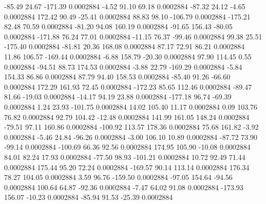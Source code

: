       -85.49       24.67     -171.39     0.0002884
       -4.52       91.10       69.18     0.0002884
      -87.32       24.12       -4.65     0.0002884
      172.42       90.49      -25.41     0.0002884
       88.83       98.10     -106.79     0.0002884
     -175.21       82.48       70.59     0.0002884
      -81.20       94.08      160.19     0.0002884
      -91.65      156.43      -80.05     0.0002884
     -171.88       76.24       77.01     0.0002884
      -11.15       76.37      -99.46     0.0002884
       99.38       25.51     -175.40     0.0002884
      -81.81       20.36      168.08     0.0002884
       87.17       72.91       86.21     0.0002884
       11.86      106.57     -169.44     0.0002884
       -6.88      158.79      -20.30     0.0002884
       97.90      114.45        0.55     0.0002884
      -94.51       88.73      174.53     0.0002884
       -3.88       22.79     -169.29     0.0002884
       -5.84      154.33       86.86     0.0002884
       87.79       94.40      158.53     0.0002884
      -85.40       91.26      -66.60     0.0002884
      172.29      161.93       72.45     0.0002884
     -172.23       85.65      112.46     0.0002884
      -89.47       81.66      -19.03     0.0002884
      -14.17       94.19       23.88     0.0002884
     -177.18       96.74      -69.39     0.0002884
        1.24       23.93     -101.75     0.0002884
       14.02      105.40       11.17     0.0002884
        0.09      103.76       76.82     0.0002884
       92.79      104.42      -12.48     0.0002884
      141.99      161.05      148.24     0.0002884
      -79.51       97.11      160.86     0.0002884
     -100.92      113.57      178.36     0.0002884
       75.68      161.82       -3.92     0.0002884
       -5.46       24.84      -96.26     0.0002884
       -3.00      106.10       10.89     0.0002884
      -87.72       73.90      -99.14     0.0002884
     -100.69       66.36       92.56     0.0002884
      174.95      105.90      -10.08     0.0002884
       84.01       82.24       17.93     0.0002884
      -77.50       98.93     -101.21     0.0002884
       10.72       92.49       71.44     0.0002884
      175.44       95.20       72.24     0.0002884
     -169.57       90.14      113.14     0.0002884
      176.34       78.27      104.05     0.0002884
        3.59       96.76     -159.50     0.0002884
      -97.05      154.64      -94.56     0.0002884
      100.64       64.87      -92.36     0.0002884
       -7.47       64.02       91.08     0.0002884
     -173.93      156.07      -10.23     0.0002884
      -85.94       91.53      -25.39     0.0002884
